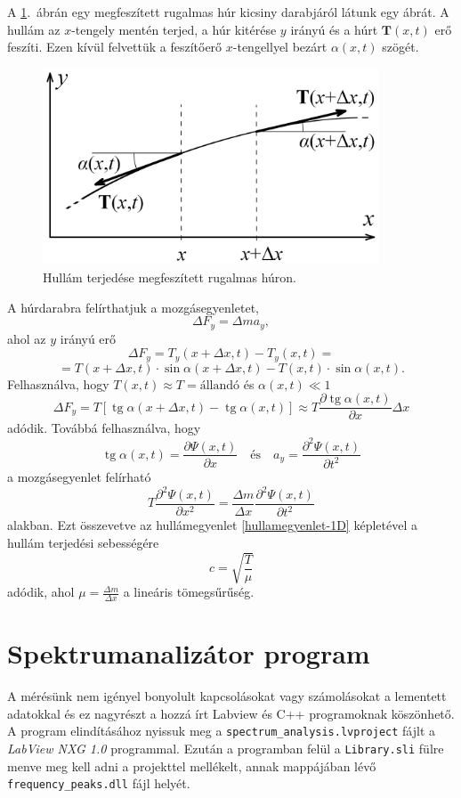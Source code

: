 \documentclass[a4paper,12pt]{article}
\newcommand{\V}[1]{\mathbf{#1}}
\DeclareMathOperator{\tg}{tg}
\begin{document}
A \ref{hur_hullam}.\ ábrán egy megfeszített rugalmas húr kicsiny darabjáról látunk egy ábrát. A hullám az $x$-tengely mentén terjed, a húr kitérése $y$ irányú és a húrt $\V{T}(x, t)$ erő feszíti. Ezen kívül felvettük a feszítőerő $x$-tengellyel bezárt $\alpha(x, t)$ szögét.

\begin{figure}[!h]
\centering
\includegraphics[width = 10cm]{hur_hullam.png}
\caption{Hullám terjedése megfeszített rugalmas húron. \cite{kisfiz1}}
\label{hur_hullam}
\end{figure}

A húrdarabra felírthatjuk a mozgásegyenletet,
$$ \Delta F_y = \Delta m a_y, $$
ahol az $y$ irányú erő
$$ \Delta F_y = T_y(x + \Delta x, t) - T_y(x, t) = $$
$$ = T(x + \Delta x, t) \cdot \sin\alpha(x + \Delta x, t) - T(x, t) \cdot \sin\alpha(x, t). $$
Felhasználva, hogy $T(x, t) \approx T = \text{állandó}$ és $\alpha(x, t) \ll 1$
$$ \Delta F_y = T \left[ \tg\alpha(x + \Delta x, t) - \tg\alpha(x, t) \right] \approx T \frac{\partial \tg\alpha(x, t)}{\partial x} \Delta x $$
adódik. Továbbá felhasználva, hogy
$$ \tg\alpha(x, t) = \frac{\partial \Psi(x, t)}{\partial x} \quad \text{és} \quad a_y = \frac{\partial^2 \Psi(x, t)}{\partial t^2} $$
a mozgásegyenlet felírható
$$ T \frac{\partial^2 \Psi(x, t)}{\partial x^2} = \frac{\Delta m}{\Delta x} \frac{\partial^2 \Psi(x, t)}{\partial t^2} $$
alakban. Ezt összevetve az hullámegyenlet \eqref{hullamegyenlet-1D} képletével a hullám terjedési sebességére
$$ c = \sqrt{\frac{T}{\mu}} $$
adódik, ahol $\mu = \frac{\Delta m}{\Delta x}$ a lineáris tömegsűrűség.



\section{Spektrumanalizátor program}

A mérésünk nem igényel bonyolult kapcsolásokat vagy számolásokat a lementett adatokkal és ez nagyrészt a hozzá írt Labview és C++ programoknak \cite{github} köszönhető. A program elindításához nyissuk meg a \texttt{spectrum\_analysis.lvproject} fájlt a \emph{LabView NXG 1.0} programmal. Ezután a programban felül a \texttt{Library.sli} fülre menve meg kell adni a projekttel mellékelt, annak mappájában lévő \texttt{frequency\_peaks.dll} fájl helyét.
\end{document}
